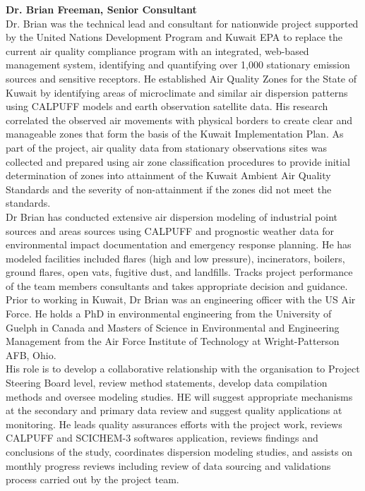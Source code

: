 \textbf{Dr. Brian Freeman, Senior Consultant} \\
Dr. Brian was the technical lead and consultant for nationwide project supported by the United Nations Development Program and Kuwait EPA to replace the current air quality compliance program with an integrated, web-based management system, identifying and quantifying over 1,000 stationary emission sources and sensitive receptors. He established Air Quality Zones for the State of Kuwait by identifying areas of microclimate and similar air dispersion patterns using CALPUFF models and earth observation satellite data.  His research correlated the observed air movements with physical borders to create clear and manageable zones that form the basis of the Kuwait Implementation Plan.
As part of the project, air quality data from stationary observations sites was collected and prepared using air zone classification procedures to provide initial determination of zones into attainment of the Kuwait Ambient Air Quality Standards and the severity of non-attainment if the zones did not meet the standards.\\
Dr Brian has conducted extensive air dispersion modeling of industrial point sources and areas sources using CALPUFF and prognostic weather data for environmental impact documentation and emergency response planning.  He has modeled facilities included flares (high and low pressure), incinerators, boilers, ground flares, open vats, fugitive dust, and landfills.	Tracks project performance of the team members consultants and takes appropriate decision and guidance. Prior to working in Kuwait, Dr Brian was an engineering officer with the US Air Force. He holds a PhD in environmental engineering from the University of Guelph in Canada and Masters of Science in Environmental and Engineering Management from the Air Force Institute of Technology at Wright-Patterson AFB, Ohio.\\
His role is to  develop a collaborative relationship with the organisation to Project Steering Board level, review method statements, develop data compilation methods and oversee modeling studies. HE will suggest appropriate mechanisms at the secondary and primary data review and suggest quality applications at monitoring. He leads quality assurances efforts with the project work, reviews  CALPUFF and SCICHEM-3 softwares application, reviews findings and conclusions of the study, coordinates dispersion modeling studies, and assists on monthly progress reviews including review of data sourcing and validations process carried out by the project team.\\



